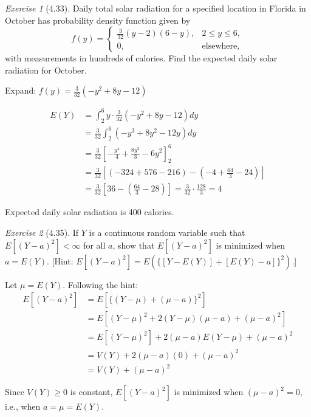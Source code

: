 \documentclass[12pt]{amsart}
\makeatletter
\theoremstyle{remark}
\newtheorem*{exercise}{Exercise}%
\renewenvironment{proof}[1][\proofname]{\par\doublespacing
  \pushQED{\qed}%
  \normalfont \topsep6\p@\@plus6\p@\relax
  \list{}{%
    \settowidth{\leftmargin}{\itshape\proofname:\hskip\labelsep}%
    \setlength{\labelwidth}{0pt}%
    \setlength{\itemindent}{-\leftmargin}%
  }%
  \item[\hskip\labelsep\itshape#1\@addpunct{:}]\ignorespaces
}{%
  \popQED\endlist\@endpefalse
  \singlespacing
}
\theoremstyle{mycomment}
\makeatother
\begin{document}
\begin{exercise}[4.33]
Daily total solar radiation for a specified location in Florida in October has probability density function given by
$$f(y) = \begin{cases}
\frac{3}{32}(y - 2)(6 - y), & 2 \leq y \leq 6, \\
0, & \text{elsewhere},
\end{cases}$$
with measurements in hundreds of calories. Find the expected daily solar radiation for October.

\begin{proof}[Solution]
Expand: $f(y) = \frac{3}{32}(-y^2 + 8y - 12)$

\begin{align*}
E(Y) &= \int_2^6 y \cdot \frac{3}{32}(-y^2 + 8y - 12) dy \\
&= \frac{3}{32}\int_2^6 (-y^3 + 8y^2 - 12y) dy \\
&= \frac{3}{32}\left[-\frac{y^4}{4} + \frac{8y^3}{3} - 6y^2\right]_2^6 \\
&= \frac{3}{32}\left[\left(-324 + 576 - 216\right) - \left(-4 + \frac{64}{3} - 24\right)\right] \\
&= \frac{3}{32}\left[36 - \left(\frac{64}{3} - 28\right)\right] = \frac{3}{32} \cdot \frac{128}{3} = 4
\end{align*}

Expected daily solar radiation is 400 calories.
\end{proof}
\end{exercise}
\begin{exercise}[4.35]
If $Y$ is a continuous random variable such that $E[(Y - a)^2] < \infty$ for all $a$, show that $E[(Y - a)^2]$ is minimized when $a = E(Y)$. [Hint: $E[(Y - a)^2] = E(\{[Y - E(Y)] + [E(Y) - a]\}^2)$.]

\begin{proof}[Solution]
Let $\mu = E(Y)$. Following the hint:
\begin{align*}
E[(Y - a)^2] &= E[\{(Y - \mu) + (\mu - a)\}^2] \\
&= E[(Y - \mu)^2 + 2(Y - \mu)(\mu - a) + (\mu - a)^2] \\
&= E[(Y - \mu)^2] + 2(\mu - a)E(Y - \mu) + (\mu - a)^2 \\
&= V(Y) + 2(\mu - a)(0) + (\mu - a)^2 \\
&= V(Y) + (\mu - a)^2
\end{align*}

Since $V(Y) \geq 0$ is constant, $E[(Y - a)^2]$ is minimized when $(\mu - a)^2 = 0$, i.e., when $a = \mu = E(Y)$.

\end{proof}
\end{exercise}
\end{document}
